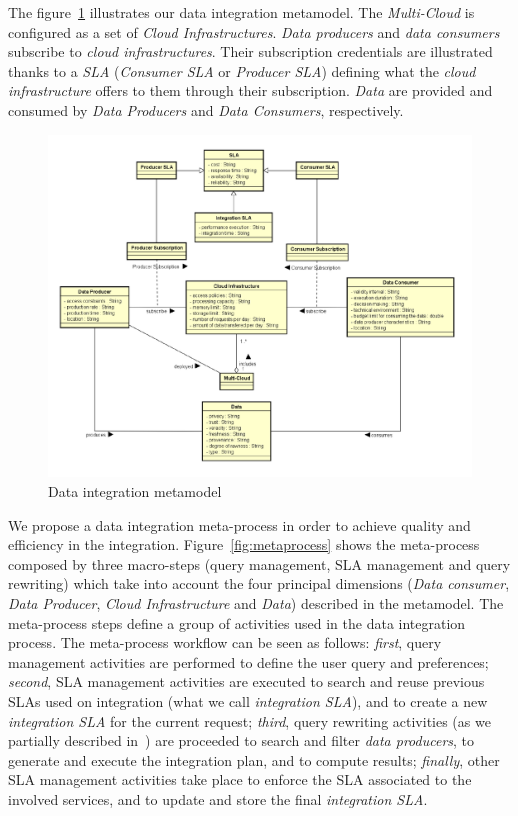 The figure~\ref{fig:scenario} illustrates our data integration metamodel.
The \textsl{Multi-Cloud} is configured as a set of \textsl{Cloud Infrastructures}. \textsl{Data producers} and \textsl{data consumers} subscribe to \textsl{cloud infrastructures}. 
Their subscription credentials are illustrated thanks to a \textsl{SLA} (\textsl{Consumer SLA} or \textsl{Producer SLA}) defining what the \textsl{cloud infrastructure} offers to them through their subscription. 
\textsl{Data} are provided and consumed by \textsl{Data Producers} and \textsl{Data Consumers}, respectively.

\begin{figure}[th!]
\center
\includegraphics[scale=0.50]{metamodel.pdf}
\caption{Data integration metamodel}\label{fig:scenario}
\end{figure}

We propose a data integration meta-process in order to achieve quality and efficiency in the integration. 
Figure~\ref{fig:metaprocess} shows the meta-process composed by three macro-steps (query management, SLA management and query rewriting) which take into account the four principal dimensions (\textsl{Data consumer}, \textsl{Data Producer}, \textsl{Cloud Infrastructure} and \textsl{Data}) described in the metamodel.
The meta-process steps define a group of activities used in the data integration process.
The meta-process workflow can be seen as follows: \textit{first}, query management activities are performed to define the user query and preferences; \textit{second}, SLA management activities are executed to search and reuse previous SLAs used on integration (what we call \textsl{integration SLA}), and to create a new \textsl{integration SLA} for the current request; \textit{third}, query rewriting activities (as we partially described in~\cite{carvalho2016}) are proceeded to search and filter \textsl{data producers}, to generate and execute the integration plan, and to compute results; \textit{finally}, other SLA management activities take place to enforce the SLA associated to the involved services, and to update and store the final \textsl{integration SLA}. 


